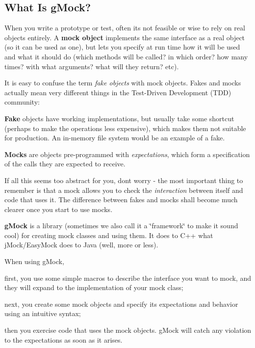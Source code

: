 \subsection*{What Is g\+Mock?}

When you write a prototype or test, often it\textquotesingle{}s not feasible or wise to rely on real objects entirely. A {\bfseries mock object} implements the same interface as a real object (so it can be used as one), but lets you specify at run time how it will be used and what it should do (which methods will be called? in which order? how many times? with what arguments? what will they return? etc).

It is easy to confuse the term {\itshape fake objects} with mock objects. Fakes and mocks actually mean very different things in the Test-\/\+Driven Development (T\+DD) community\+:


\begin{DoxyItemize}
\item {\bfseries Fake} objects have working implementations, but usually take some shortcut (perhaps to make the operations less expensive), which makes them not suitable for production. An in-\/memory file system would be an example of a fake.
\item {\bfseries Mocks} are objects pre-\/programmed with {\itshape expectations}, which form a specification of the calls they are expected to receive.
\end{DoxyItemize}

If all this seems too abstract for you, don\textquotesingle{}t worry -\/ the most important thing to remember is that a mock allows you to check the {\itshape interaction} between itself and code that uses it. The difference between fakes and mocks shall become much clearer once you start to use mocks.

{\bfseries g\+Mock} is a library (sometimes we also call it a \char`\"{}framework\char`\"{} to make it sound cool) for creating mock classes and using them. It does to C++ what j\+Mock/\+Easy\+Mock does to Java (well, more or less).

When using g\+Mock,


\begin{DoxyEnumerate}
\item first, you use some simple macros to describe the interface you want to mock, and they will expand to the implementation of your mock class;
\item next, you create some mock objects and specify its expectations and behavior using an intuitive syntax;
\item then you exercise code that uses the mock objects. g\+Mock will catch any violation to the expectations as soon as it arises.
\end{DoxyEnumerate}

